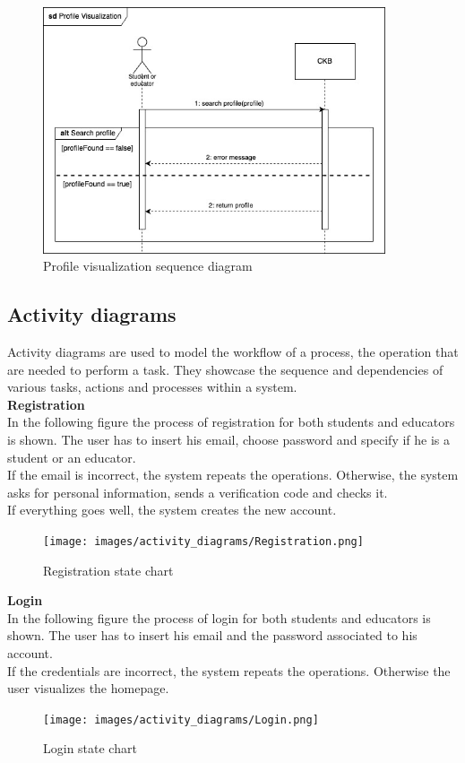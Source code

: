 \begin{figure}[H]
    \centering
    \includegraphics[width=0.9\textwidth]{images/seq_diagrams/profile_visualization.jpg}
    \caption{Profile visualization sequence diagram}
\end{figure}
\clearpage

\subsection{Activity diagrams}
Activity diagrams are used to model the workflow of a process, the operation that are needed to perform a task.
They showcase the sequence and dependencies of various tasks, actions and processes within a system.\\

\textbf{Registration}\\
In the following figure the process of registration for both students and educators is shown. 
The user has to insert his email, choose  password and specify if he is a student or an educator.\\
If the email is incorrect, the system repeats the operations. Otherwise, the system asks for personal information,
 sends a verification code and checks it.\\If everything goes well, the system creates the new account.
\begin{figure} [H]
  \centering
  \texttt{[image: images/activity\_diagrams/Registration.png]}
  \caption{Registration state chart}
\end{figure} \vspace{1cm}

\textbf{Login}\\
In the following figure the process of login for both students and educators is shown. 
The user has to insert his email and the password associated to his account.
\\If the credentials are incorrect, the system repeats the operations. Otherwise the user visualizes the homepage.
\begin{figure} [H]
  \centering
  \texttt{[image: images/activity\_diagrams/Login.png]}
  \caption{Login state chart}
\end{figure} \vspace{1cm}

